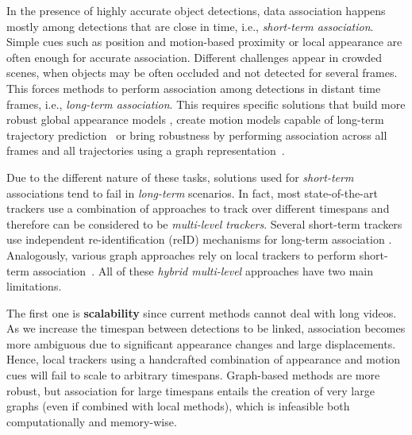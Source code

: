 \documentclass[10pt,twocolumn,letterpaper]{article}
\begin{document}
In the presence of highly accurate object detections, data association happens mostly among detections that are close in time, i.e., \textit{short-term association}. Simple cues such as position and motion-based proximity \cite{sort, tracktor, centertrack, Tokmakov_2021_ICCV, bytetrack} or local appearance \cite{jde, deepsort, zhang2021fairmot, qdtrack} are often enough for accurate association.
Different challenges appear in crowded scenes, when objects may be often occluded and not detected for several frames. This forces methods to perform association among detections in distant time frames, i.e., \textit{long-term association}. 
This requires specific solutions that build more robust global appearance models \cite{deepcc, Tang_2017_CVPR, deepmatching},  create motion models capable of long-term trajectory prediction~\cite{Robicquet2016LearningSE, Leal-Taixe_2014_CVPR, quovadis_patrick} or bring robustness by performing association across all frames and all trajectories using a graph representation~\cite{subgraph, mpntrack, lpc, gmt, Tang_2017_CVPR}. 


Due to the different nature of these tasks, solutions used for \textit{short-term} associations tend to fail in \textit{long-term} scenarios. 
In fact, most state-of-the-art trackers use a combination of approaches to track over different timespans and therefore can be considered to be \textit{multi-level trackers}. 
Several short-term trackers use independent re-identification (reID) mechanisms for long-term association \cite{tracktor, deepsort, Xu_2020_CVPR, Son_2017_CVPR, trackformer}.  Analogously, various graph approaches rely on local trackers to perform short-term association~\cite{mpntrack, lift, aplift}. All of these \textit{hybrid multi-level} approaches have two main limitations.


The first one is \textbf{scalability} since current methods cannot deal with long videos. As we increase the timespan between detections to be linked, association becomes more ambiguous due to significant appearance changes and large displacements. Hence, local trackers using a handcrafted combination of appearance and motion cues will fail to scale to arbitrary timespans.
Graph-based methods are more robust, but association for large timespans entails the creation of very large graphs (even if combined with local methods), which is infeasible both computationally and memory-wise. 
\end{document}
